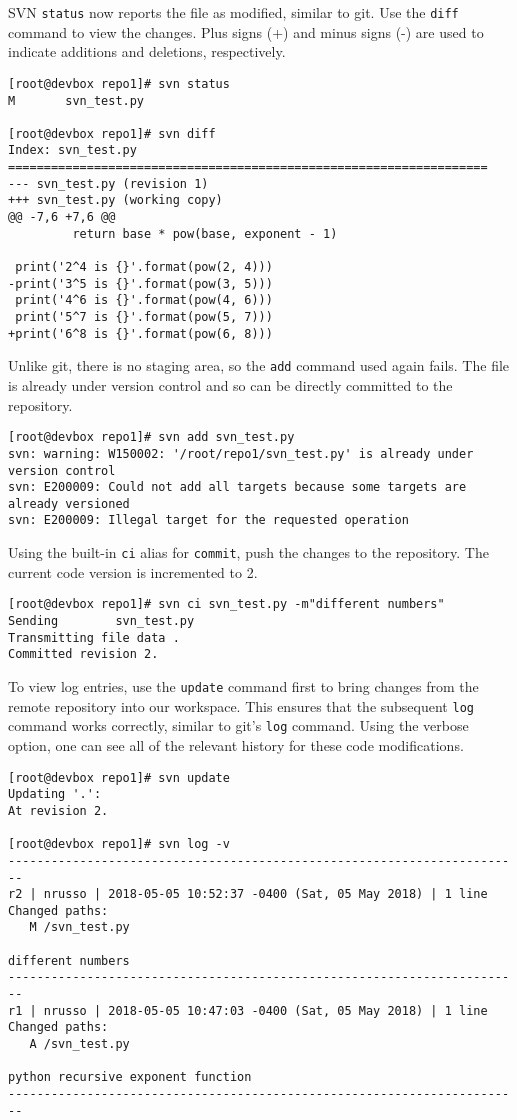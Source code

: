 SVN \verb|status| now reports the file as modified, similar to git. Use the
\verb|diff| command to view the changes. Plus signs (+) and minus signs (-)
are used to indicate additions and deletions, respectively.

\begin{verbatim}
[root@devbox repo1]# svn status
M       svn_test.py

[root@devbox repo1]# svn diff
Index: svn_test.py
===================================================================
--- svn_test.py	(revision 1)
+++ svn_test.py	(working copy)
@@ -7,6 +7,6 @@
         return base * pow(base, exponent - 1)

 print('2^4 is {}'.format(pow(2, 4)))
-print('3^5 is {}'.format(pow(3, 5)))
 print('4^6 is {}'.format(pow(4, 6)))
 print('5^7 is {}'.format(pow(5, 7)))
+print('6^8 is {}'.format(pow(6, 8)))
\end{verbatim}

Unlike git, there is no staging area, so the \verb|add| command used again
fails. The file is already under version control and so can be directly
committed to the repository.

\begin{verbatim}
[root@devbox repo1]# svn add svn_test.py
svn: warning: W150002: '/root/repo1/svn_test.py' is already under version control
svn: E200009: Could not add all targets because some targets are already versioned
svn: E200009: Illegal target for the requested operation
\end{verbatim}

Using the built-in \verb|ci| alias for \verb|commit|, push the changes to the
repository. The current code version is incremented to 2.

\begin{verbatim}
[root@devbox repo1]# svn ci svn_test.py -m"different numbers"
Sending        svn_test.py
Transmitting file data .
Committed revision 2.
 \end{verbatim}

To view log entries, use the \verb|update| command first to bring changes from
the remote repository into our workspace. This ensures that the subsequent
\verb|log| command works correctly, similar to git's \verb|log| command. Using
the verbose option, one can see all of the relevant history for these code
modifications.

\begin{verbatim}
[root@devbox repo1]# svn update
Updating '.':
At revision 2.

[root@devbox repo1]# svn log -v
------------------------------------------------------------------------
r2 | nrusso | 2018-05-05 10:52:37 -0400 (Sat, 05 May 2018) | 1 line
Changed paths:
   M /svn_test.py

different numbers
------------------------------------------------------------------------
r1 | nrusso | 2018-05-05 10:47:03 -0400 (Sat, 05 May 2018) | 1 line
Changed paths:
   A /svn_test.py

python recursive exponent function
------------------------------------------------------------------------
\end{verbatim}

